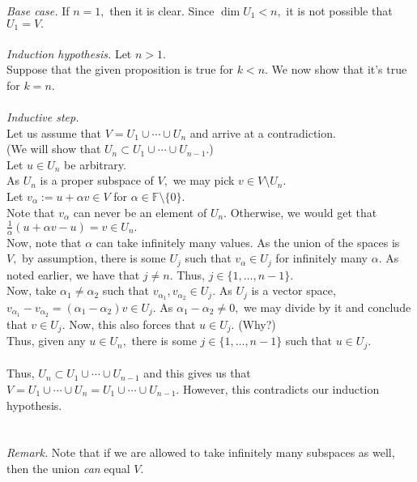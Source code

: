 \documentclass{article}
\begin{document}
\begin{enumerate}
	\emph{Base case.} If $n = 1,$ then it is clear. Since $\dim U_1 < n,$ it is not possible that $U_1 = V.$\\~\\
	\emph{Induction hypothesis.} Let $n > 1.$\\
	Suppose that the given proposition is true for $k < n.$ We now show that it's true for $k = n.$\\~\\
	\emph{Inductive step.}\\
	Let us assume that $V = U_1 \cup \cdots \cup U_n$ and arrive at a contradiction.\\
	(We will show that $U_n \subset U_1 \cup \cdots \cup U_{n-1}$.)\\
	Let $u \in U_n$ be arbitrary.\\
	As $U_n$ is a proper subspace of $V,$ we may pick $v \in V \setminus U_n.$\\
	Let $v_\alpha := u + \alpha v \in V$ for $\alpha \in \mathbb{F}\setminus\{0\}.$\\
	Note that $v_\alpha$ can never be an element of $U_n.$ Otherwise, we would get that $\frac{1}{\alpha}\left(u + \alpha v - u\right) = v \in U_n.$\\
	Now, note that $\alpha$ can take infinitely many values. As the union of the spaces is $V,$ by assumption, there is some $U_j$ such that $v_\alpha \in U_j$ for infinitely many $\alpha.$ As noted earlier, we have that $j \neq n.$ Thus, $j \in \{1, \ldots, n-1\}.$\\
	Now, take $\alpha_1 \neq \alpha_2$ such that $v_{\alpha_1}, v_{\alpha_2} \in U_j.$ As $U_j$ is a vector space, $v_{\alpha_1} - v_{\alpha_2} = (\alpha_1 - \alpha_2)v \in U_j.$ As $\alpha_1 - \alpha_2 \neq 0,$ we may divide by it and conclude that $v \in U_j.$ Now, this also forces that $u \in U_j.$ (Why?)\\
	Thus, given any $u \in U_n,$ there is some $j \in \{1, \ldots, n-1\}$ such that $u \in U_j.$\\~\\
	Thus, $U_n \subset U_1 \cup \cdots \cup U_{n-1}$ and this gives us that $V = U_1 \cup \cdots \cup U_n = U_1 \cup \cdots \cup U_{n-1}.$ However, this contradicts our induction hypothesis.\\~\\~\\
	\emph{Remark.} Note that if we are allowed to take infinitely many subspaces as well, then the union \emph{can} equal $V.$
\end{enumerate}
\end{document}
